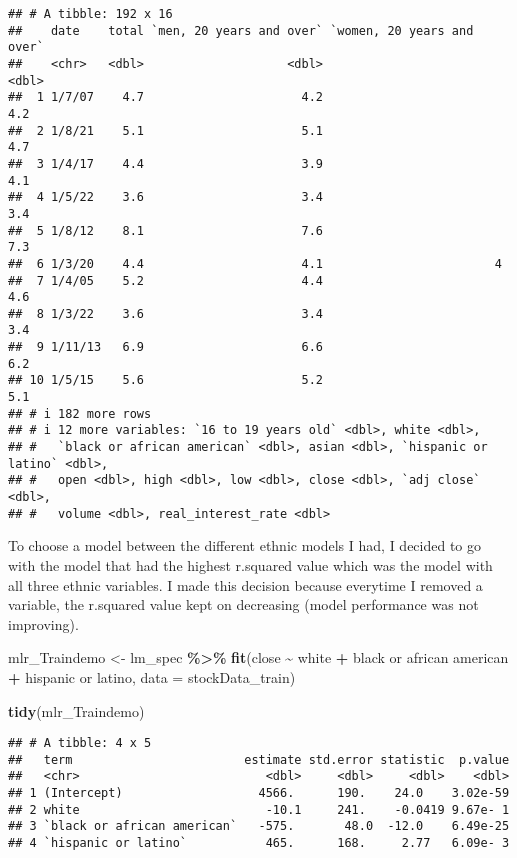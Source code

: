 \documentclass[
]{article}
\newenvironment{Shaded}{\begin{snugshade}}{\end{snugshade}}
\newcommand{\AttributeTok}[1]{\textcolor[rgb]{0.13,0.29,0.53}{#1}}
\newcommand{\FunctionTok}[1]{\textcolor[rgb]{0.13,0.29,0.53}{\textbf{#1}}}
\newcommand{\NormalTok}[1]{#1}
\newcommand{\OtherTok}[1]{\textcolor[rgb]{0.56,0.35,0.01}{#1}}
\newcommand{\SpecialCharTok}[1]{\textcolor[rgb]{0.81,0.36,0.00}{\textbf{#1}}}
\newcommand{\StringTok}[1]{\textcolor[rgb]{0.31,0.60,0.02}{#1}}
\begin{document}
\begin{verbatim}
## # A tibble: 192 x 16
##    date    total `men, 20 years and over` `women, 20 years and over`
##    <chr>   <dbl>                    <dbl>                      <dbl>
##  1 1/7/07    4.7                      4.2                        4.2
##  2 1/8/21    5.1                      5.1                        4.7
##  3 1/4/17    4.4                      3.9                        4.1
##  4 1/5/22    3.6                      3.4                        3.4
##  5 1/8/12    8.1                      7.6                        7.3
##  6 1/3/20    4.4                      4.1                        4  
##  7 1/4/05    5.2                      4.4                        4.6
##  8 1/3/22    3.6                      3.4                        3.4
##  9 1/11/13   6.9                      6.6                        6.2
## 10 1/5/15    5.6                      5.2                        5.1
## # i 182 more rows
## # i 12 more variables: `16 to 19 years old` <dbl>, white <dbl>,
## #   `black or african american` <dbl>, asian <dbl>, `hispanic or latino` <dbl>,
## #   open <dbl>, high <dbl>, low <dbl>, close <dbl>, `adj close` <dbl>,
## #   volume <dbl>, real_interest_rate <dbl>
\end{verbatim}

To choose a model between the different ethnic models I had, I decided
to go with the model that had the highest r.squared value which was the
model with all three ethnic variables. I made this decision because
everytime I removed a variable, the r.squared value kept on decreasing
(model performance was not improving).

\begin{Shaded}
\begin{Highlighting}[]
\NormalTok{mlr\_Traindemo }\OtherTok{\textless{}{-}}\NormalTok{ lm\_spec }\SpecialCharTok{\%\textgreater{}\%} 
  \FunctionTok{fit}\NormalTok{(close }\SpecialCharTok{\textasciitilde{}}\NormalTok{ white }\SpecialCharTok{+} \StringTok{\textasciigrave{}}\AttributeTok{black or african american}\StringTok{\textasciigrave{}} \SpecialCharTok{+} \StringTok{\textasciigrave{}}\AttributeTok{hispanic or latino}\StringTok{\textasciigrave{}}\NormalTok{, }\AttributeTok{data =}\NormalTok{ stockData\_train)}

\FunctionTok{tidy}\NormalTok{(mlr\_Traindemo)}
\end{Highlighting}
\end{Shaded}

\begin{verbatim}
## # A tibble: 4 x 5
##   term                        estimate std.error statistic  p.value
##   <chr>                          <dbl>     <dbl>     <dbl>    <dbl>
## 1 (Intercept)                   4566.      190.    24.0    3.02e-59
## 2 white                          -10.1     241.    -0.0419 9.67e- 1
## 3 `black or african american`   -575.       48.0  -12.0    6.49e-25
## 4 `hispanic or latino`           465.      168.     2.77   6.09e- 3
\end{verbatim}
\end{document}
